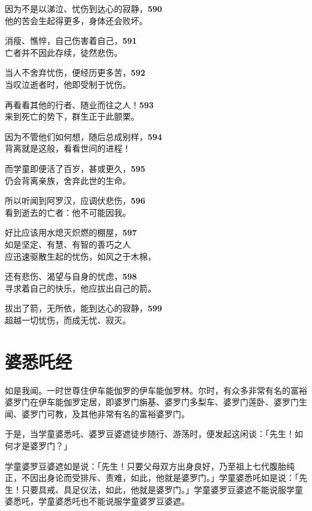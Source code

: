 因为不是以涕泣、忧伤到达心的寂静，\hfill{\grayfootnotesize \textbf{590}} \\
他的苦会生起得更多，身体还会败坏。


消瘦、憔悴，自己伤害着自己，\hfill{\grayfootnotesize \textbf{591}} \\
亡者并不因此存续，徒然悲伤。


当人不舍弃忧伤，便经历更多苦，\hfill{\grayfootnotesize \textbf{592}} \\
当叹泣逝者时，他即受制于忧伤。


再看看其他的行者、随业而往之人！\hfill{\grayfootnotesize \textbf{593}} \\
来到死亡的势下，群生正于此颤栗。


因为不管他们如何想，随后总成别样，\hfill{\grayfootnotesize \textbf{594}} \\
背离就是这般，看看世间的进程！


而学童即便活了百岁，甚或更久，\hfill{\grayfootnotesize \textbf{595}} \\
仍会背离亲族，舍弃此世的生命。

所以听闻到阿罗汉，应调伏悲伤，\hfill{\grayfootnotesize \textbf{596}} \\
看到逝去的亡者：他不可能因我。


好比应该用水熄灭炽燃的棚屋，\hfill{\grayfootnotesize \textbf{597}} \\
如是坚定、有慧、有智的善巧之人\\
应迅速驱散生起的忧伤，如风之于木棉，


还有悲伤、渴望与自身的忧虑，\hfill{\grayfootnotesize \textbf{598}} \\
寻求着自己的快乐，他应拔出自己的箭。


拔出了箭，无所依，能到达心的寂静，\hfill{\grayfootnotesize \textbf{599}} \\
超越一切忧伤，而成无忧、寂灭。


\section{婆悉吒经}

如是我闻。一时世尊住伊车能伽罗的伊车能伽罗林。尔时，有众多非常有名的富裕婆罗门在伊车能伽罗定居，即婆罗门旃基、婆罗门多梨车、婆罗门莲卧、婆罗门生闻、婆罗门可教，及其他非常有名的富裕婆罗门。


于是，当学童婆悉吒、婆罗豆婆遮徒步随行、游荡时，便发起这闲谈：「先生！如何才是婆罗门？」


学童婆罗豆婆遮如是说：「先生！只要父母双方出身良好，乃至祖上七代腹胎纯正，不因出身论而受排斥、责难，如此，他就是婆罗门。」学童婆悉吒如是说：「先生！只要具戒、具足仪法，如此，他就是婆罗门。」学童婆罗豆婆遮不能说服学童婆悉吒，学童婆悉吒也不能说服学童婆罗豆婆遮。


